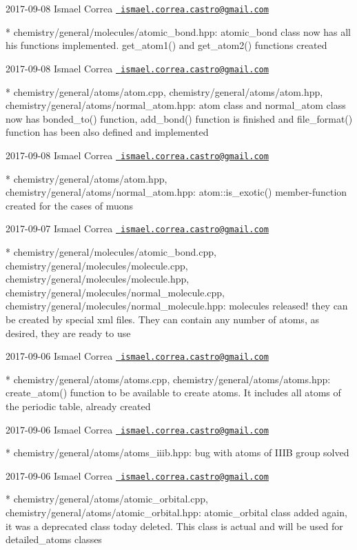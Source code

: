  2017-\/09-\/08 Ismael Correa \href{mailto:ismael.correa.castro@gmail.com}{\texttt{ ismael.\+correa.\+castro@gmail.\+com}} \begin{DoxyVerb}* chemistry/general/molecules/atomic_bond.hpp: atomic_bond class now
has all his functions implemented. get_atom1() and get_atom2()
functions created
\end{DoxyVerb}
 2017-\/09-\/08 Ismael Correa \href{mailto:ismael.correa.castro@gmail.com}{\texttt{ ismael.\+correa.\+castro@gmail.\+com}} \begin{DoxyVerb}* chemistry/general/atoms/atom.cpp,
chemistry/general/atoms/atom.hpp,
chemistry/general/atoms/normal_atom.hpp: atom class and normal_atom
class now has bonded_to() function, add_bond() function is finished
and file_format() function has been also defined and implemented
\end{DoxyVerb}
 2017-\/09-\/08 Ismael Correa \href{mailto:ismael.correa.castro@gmail.com}{\texttt{ ismael.\+correa.\+castro@gmail.\+com}} \begin{DoxyVerb}* chemistry/general/atoms/atom.hpp,
chemistry/general/atoms/normal_atom.hpp: atom::is_exotic()
member-function created for the cases of muons
\end{DoxyVerb}
 2017-\/09-\/07 Ismael Correa \href{mailto:ismael.correa.castro@gmail.com}{\texttt{ ismael.\+correa.\+castro@gmail.\+com}} \begin{DoxyVerb}* chemistry/general/molecules/atomic_bond.cpp,
chemistry/general/molecules/molecule.cpp,
chemistry/general/molecules/molecule.hpp,
chemistry/general/molecules/normal_molecule.cpp,
chemistry/general/molecules/normal_molecule.hpp: molecules released!
they can be created by special xml files. They can contain any
number of atoms, as desired, they are ready to use
\end{DoxyVerb}
 2017-\/09-\/06 Ismael Correa \href{mailto:ismael.correa.castro@gmail.com}{\texttt{ ismael.\+correa.\+castro@gmail.\+com}} \begin{DoxyVerb}* chemistry/general/atoms/atoms.cpp,
chemistry/general/atoms/atoms.hpp: create_atom() function to be
available to create atoms. It includes all atoms of the periodic
table, already created
\end{DoxyVerb}
 2017-\/09-\/06 Ismael Correa \href{mailto:ismael.correa.castro@gmail.com}{\texttt{ ismael.\+correa.\+castro@gmail.\+com}} \begin{DoxyVerb}* chemistry/general/atoms/atoms_iiib.hpp: bug with atoms of IIIB
group solved
\end{DoxyVerb}
 2017-\/09-\/06 Ismael Correa \href{mailto:ismael.correa.castro@gmail.com}{\texttt{ ismael.\+correa.\+castro@gmail.\+com}} \begin{DoxyVerb}* chemistry/general/atoms/atomic_orbital.cpp,
chemistry/general/atoms/atomic_orbital.hpp: atomic_orbital class
added again, it was a deprecated class today deleted. This class is
actual and will be used for detailed_atoms classes
\end{DoxyVerb}
